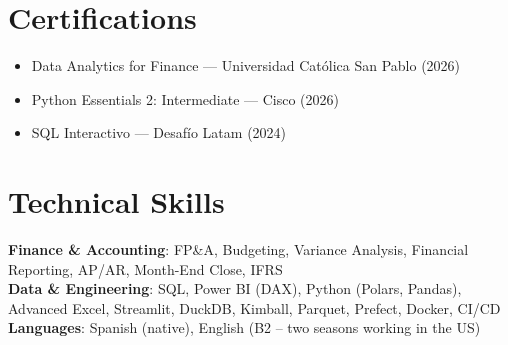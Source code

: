 \documentclass[letterpaper,10pt]{article}
\newcommand{\resumeItem}[1]{
  \item\small{
    {#1 \vspace{-2pt}}
  }
}
\newcommand{\resumeSubHeadingListStart}{\begin{itemize}[leftmargin=0.15in, label={}]}
\newcommand{\resumeSubHeadingListEnd}{\end{itemize}}
\begin{document}
\section{Certifications}
  \resumeSubHeadingListStart
    \resumeItem{Data Analytics for Finance --- Universidad Cat\'olica San Pablo (2026)}
    \resumeItem{Python Essentials 2: Intermediate --- Cisco (2026)}
    \resumeItem{SQL Interactivo --- Desaf\'io Latam (2024)}
  \resumeSubHeadingListEnd


\section{Technical Skills}
 \begin{itemize}[leftmargin=0.15in, label={}]
    \small{\item{
     \textbf{Finance \& Accounting}{: FP\&A, Budgeting, Variance Analysis, Financial Reporting, AP/AR, Month-End Close, IFRS} \\
     \textbf{Data \& Engineering}{: SQL, Power BI (DAX), Python (Polars, Pandas), Advanced Excel, Streamlit, DuckDB, Kimball, Parquet, Prefect, Docker, CI/CD} \\
     \textbf{Languages}{: Spanish (native), English (B2 -- two seasons working in the US)}
    }}
 \end{itemize}


\end{document}
